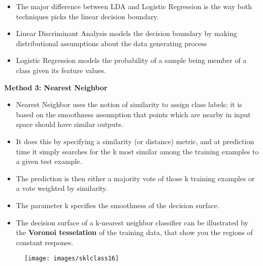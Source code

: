 \documentclass[SKL-MASTER.tex]{subfiles}
\begin{document}
\begin{itemize}
\item The major difference between LDA and Logistic Regression is the way both techniques picks the linear decision boundary.
\item  Linear Discriminant Analysis models the decision boundary by making distributional assumptions about the data generating process 
\item Logistic Regression models the probability of a sample being member of a class given its feature values.
\end{itemize}

\newpage
\textbf{Method 3: Nearest Neighbor}

\begin{itemize}
\item Nearest Neighbor uses the notion of similarity to assign class labels; it is based on the smoothness assumption that points which are nearby in input space should have similar outputs.
\item  It does this by specifying a similarity (or distance) metric, and at prediction time it simply searches for the k most similar among the training examples to a given test example.
\end{itemize}


	\begin{itemize} 
		\item The prediction is then either a majority vote of those k training examples or a vote weighted by similarity. \item The parameter k specifies the smoothness of the decision surface.\item  The decision surface of a k-nearest neighbor classifier can be illustrated by the \textbf{Voronoi tesselation} of the training data, that show you the regions of constant respones.
\end{itemize}
\newpage
	\begin{figure}[h!]
		\centering
		\texttt{[image: images/sklclass16]}
	
	\end{figure}
	
\end{document}
